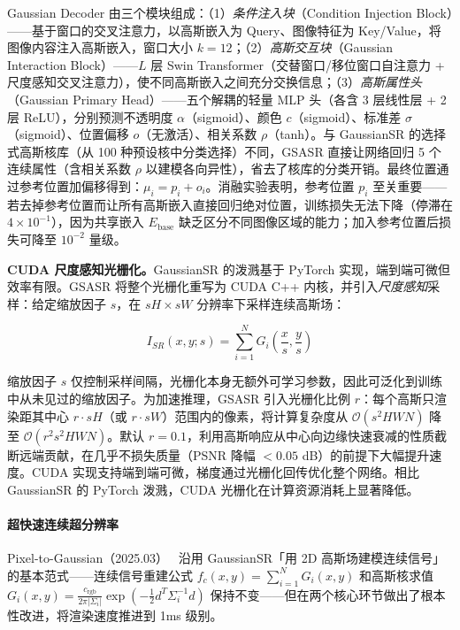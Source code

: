 Gaussian Decoder 由三个模块组成：（1）\emph{条件注入块}（Condition Injection Block）——基于窗口的交叉注意力，以高斯嵌入为 Query、图像特征为 Key/Value，将图像内容注入高斯嵌入，窗口大小 $k=12$；（2）\emph{高斯交互块}（Gaussian Interaction Block）——$L$ 层 Swin Transformer（交替窗口/移位窗口自注意力 + 尺度感知交叉注意力），使不同高斯嵌入之间充分交换信息；（3）\emph{高斯属性头}（Gaussian Primary Head）——五个解耦的轻量 MLP 头（各含 3 层线性层 + 2 层 ReLU），分别预测不透明度 $\alpha$（sigmoid）、颜色 $c$（sigmoid）、标准差 $\sigma$（sigmoid）、位置偏移 $o$（无激活）、相关系数 $\rho$（tanh）。与 GaussianSR 的选择式高斯核库（从 100 种预设核中分类选择）不同，GSASR 直接让网络回归 5 个连续属性（含相关系数 $\rho$ 以建模各向异性），省去了核库的分类开销。最终位置通过参考位置加偏移得到：$\mu_i = p_i + o_i$。消融实验表明，参考位置 $p_i$ 至关重要——若去掉参考位置而让所有高斯嵌入直接回归绝对位置，训练损失无法下降（停滞在 $4 \times 10^{-1}$），因为共享嵌入 $E_{\text{base}}$ 缺乏区分不同图像区域的能力；加入参考位置后损失可降至 $10^{-2}$ 量级。

\textbf{CUDA 尺度感知光栅化。}GaussianSR 的泼溅基于 PyTorch 实现，端到端可微但效率有限。GSASR 将整个光栅化重写为 CUDA C++ 内核，并引入\emph{尺度感知}采样：给定缩放因子 $s$，在 $sH \times sW$ 分辨率下采样连续高斯场：

\begin{equation}
    I_{SR}(x, y; s) = \sum_{i=1}^{N} G_i\!\left(\frac{x}{s}, \frac{y}{s}\right)
\end{equation}

缩放因子 $s$ 仅控制采样间隔，光栅化本身无额外可学习参数，因此可泛化到训练中从未见过的缩放因子。为加速推理，GSASR 引入光栅化比例 $r$：每个高斯只渲染距其中心 $r \cdot sH$（或 $r \cdot sW$）范围内的像素，将计算复杂度从 $\mathcal{O}(s^2 HWN)$ 降至 $\mathcal{O}(r^2 s^2 HWN)$。默认 $r=0.1$，利用高斯响应从中心向边缘快速衰减的性质截断远端贡献，在几乎不损失质量（PSNR 降幅 $<0.05$ dB）的前提下大幅提升速度。CUDA 实现支持端到端可微，梯度通过光栅化回传优化整个网络。相比 GaussianSR 的 PyTorch 泼溅，CUDA 光栅化在计算资源消耗上显著降低。

\paragraph{超快速连续超分辨率}

Pixel-to-Gaussian（2025.03）~\cite{2503_06617} 沿用 GaussianSR「用 2D 高斯场建模连续信号」的基本范式——连续信号重建公式 $f_c(x, y) = \sum_{i=1}^{N} G_i(x, y)$ 和高斯核求值 $G_i(x, y) = \frac{c_{\text{rgb}}}{2\pi|\Sigma_i|} \exp(-\frac{1}{2} d^T \Sigma_i^{-1} d)$ 保持不变——但在两个核心环节做出了根本性改进，将渲染速度推进到 1ms 级别。

